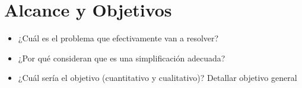 \section{Alcance y Objetivos}

\begin{tcolorbox}[colback=yellow!10!white,colframe=red!75!black,title=Recomendaciones]
  \begin{itemize}
      \item ¿Cuál es el problema que efectivamente van a resolver?
      \item ¿Por qué consideran que es una simplificación adecuada?
      \item ¿Cuál sería el objetivo (cuantitativo y cualitativo)? Detallar objetivo general
  \end{itemize}
\end{tcolorbox}

\pagebreak